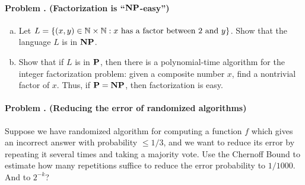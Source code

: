 \documentclass[11pt]{article}
\newcounter{problem}
\newenvironment{problem}[1]{\stepcounter{problem}
\paragraph{Problem \theproblem. #1}}{}
\begin{document}
\begin{problem}{(Factorization is ``$\NP$-easy'')}
\begin{enumerate}[a.]
\item Let $L= \{ (x,y) \in \N \times \N:  \textrm{$x$ has a factor between
$2$ and $y$}\}$. Show that the language $L$ is in $\NP$.
\item Show that if $L$ is in $\P$, then
there is a polynomial-time algorithm for the integer factorization problem: given a composite number $x$, find a nontrivial factor of $x$.
Thus, if $\P=\NP$, then factorization is easy.
\end{enumerate}
\end{problem}

\begin{problem}{(Reducing the error of randomized algorithms)}
Suppose we have randomized algorithm for computing a function $f$
which gives an incorrect answer with probability $\leq 1/3$, and we want
to reduce its error by repeating it several times and taking a majority vote.
Use the Chernoff Bound to estimate how many repetitions suffice to reduce the error probability to $1/1000$.  And to $2^{-k}$?
\end{problem}
\end{document}
